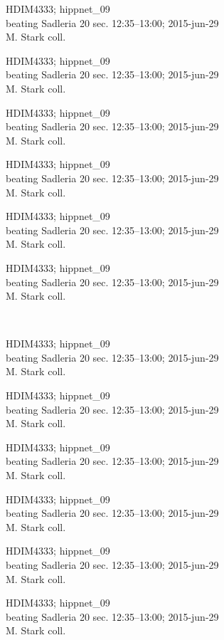 \documentclass[2pt]{extarticle}
\begin{document}
\noindent
\parbox{0.16\textwidth}{\tiny \raggedright \rule[-0.3\baselineskip]{0pt}{10pt}HDIM4333; hippnet\_09\\ beating Sadleria 20 sec. 12:35--13:00; 2015-jun-29\\ M. Stark coll.}
\parbox{0.16\textwidth}{\tiny \raggedright \rule[-0.3\baselineskip]{0pt}{10pt}HDIM4333; hippnet\_09\\ beating Sadleria 20 sec. 12:35--13:00; 2015-jun-29\\ M. Stark coll.}
\parbox{0.16\textwidth}{\tiny \raggedright \rule[-0.3\baselineskip]{0pt}{10pt}HDIM4333; hippnet\_09\\ beating Sadleria 20 sec. 12:35--13:00; 2015-jun-29\\ M. Stark coll.}
\parbox{0.16\textwidth}{\tiny \raggedright \rule[-0.3\baselineskip]{0pt}{10pt}HDIM4333; hippnet\_09\\ beating Sadleria 20 sec. 12:35--13:00; 2015-jun-29\\ M. Stark coll.}
\parbox{0.16\textwidth}{\tiny \raggedright \rule[-0.3\baselineskip]{0pt}{10pt}HDIM4333; hippnet\_09\\ beating Sadleria 20 sec. 12:35--13:00; 2015-jun-29\\ M. Stark coll.}
\parbox{0.16\textwidth}{\tiny \raggedright \rule[-0.3\baselineskip]{0pt}{10pt}HDIM4333; hippnet\_09\\ beating Sadleria 20 sec. 12:35--13:00; 2015-jun-29\\ M. Stark coll.} \\ 
\vspace{0.001in} 

\noindent
\parbox{0.16\textwidth}{\tiny \raggedright \rule[-0.3\baselineskip]{0pt}{10pt}HDIM4333; hippnet\_09\\ beating Sadleria 20 sec. 12:35--13:00; 2015-jun-29\\ M. Stark coll.}
\parbox{0.16\textwidth}{\tiny \raggedright \rule[-0.3\baselineskip]{0pt}{10pt}HDIM4333; hippnet\_09\\ beating Sadleria 20 sec. 12:35--13:00; 2015-jun-29\\ M. Stark coll.}
\parbox{0.16\textwidth}{\tiny \raggedright \rule[-0.3\baselineskip]{0pt}{10pt}HDIM4333; hippnet\_09\\ beating Sadleria 20 sec. 12:35--13:00; 2015-jun-29\\ M. Stark coll.}
\parbox{0.16\textwidth}{\tiny \raggedright \rule[-0.3\baselineskip]{0pt}{10pt}HDIM4333; hippnet\_09\\ beating Sadleria 20 sec. 12:35--13:00; 2015-jun-29\\ M. Stark coll.}
\parbox{0.16\textwidth}{\tiny \raggedright \rule[-0.3\baselineskip]{0pt}{10pt}HDIM4333; hippnet\_09\\ beating Sadleria 20 sec. 12:35--13:00; 2015-jun-29\\ M. Stark coll.}
\parbox{0.16\textwidth}{\tiny \raggedright \rule[-0.3\baselineskip]{0pt}{10pt}HDIM4333; hippnet\_09\\ beating Sadleria 20 sec. 12:35--13:00; 2015-jun-29\\ M. Stark coll.} \\ 
\vspace{0.001in} 
\end{document}
